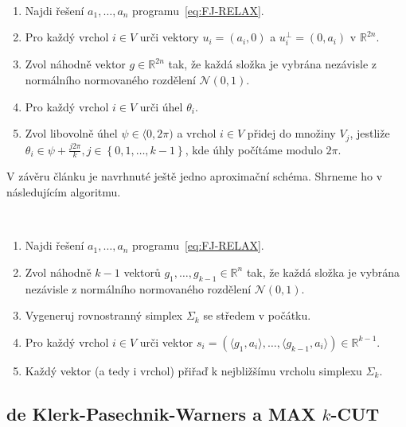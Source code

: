 \begin{alg}\cite{newman}$ $
    \begin{enumerate}
        \item Najdi řešení $a_1, \dots, a_n$ programu~\ref{eq:FJ-RELAX}.
        \item Pro každý vrchol $i \in V$ urči vektory $u_i = (a_i, 0)$ a $u_i^\bot = (0, a_i)$ v $\mathbb{R}^{2n}$.
        \item Zvol náhodně vektor $g \in \mathbb{R}^{2n}$ tak, že každá složka je vybrána nezávisle z normálního normovaného rozdělení $\mathcal{N}(0, 1)$.
        \item Pro každý vrchol $i \in V$ urči úhel $\theta_i$.
        \item Zvol libovolně úhel $\psi \in \langle 0, 2 \pi )$ a vrchol $i \in V$ přidej do množiny $V_j$, jestliže $\theta_i \in \psi + \frac{j 2 \pi}{k}, j \in \left\{ 0, 1, \dots, k-1 \right\}$, kde úhly počítáme modulo $2\pi$.
    \end{enumerate}
    \label{alg:n-max-k-cut-1}
\end{alg}

V závěru článku je navrhnuté ještě jedno aproximační schéma. Shrneme ho v následujícím algoritmu.

\begin{alg}\cite{newman}$ $
    \begin{enumerate}
        \item Najdi řešení $a_1, \dots, a_n$ programu~\ref{eq:FJ-RELAX}.
        \item Zvol náhodně $k-1$ vektorů $g_1, \dots, g_{k-1} \in \mathbb{R}^n$ tak, že každá složka je vybrána nezávisle z normálního normovaného rozdělení $\mathcal{N}(0, 1)$.
        \item Vygeneruj rovnostranný simplex $\Sigma_k$ se středem v počátku.
        \item Pro každý vrchol $i \in V$ urči vektor $s_i = \left( \langle g_1, a_i \rangle, \dots, \langle g_{k-1}, a_i \rangle \right) \in \mathbb{R}^{k-1}$.
        \item Každý vektor (a tedy i vrchol) přiřaď k nejbližšímu vrcholu simplexu $\Sigma_k$.
    \end{enumerate}
    \label{alg:n-max-k-cut-2}
\end{alg}


\subsection{de Klerk-Pasechnik-Warners a MAX $k$-CUT}

